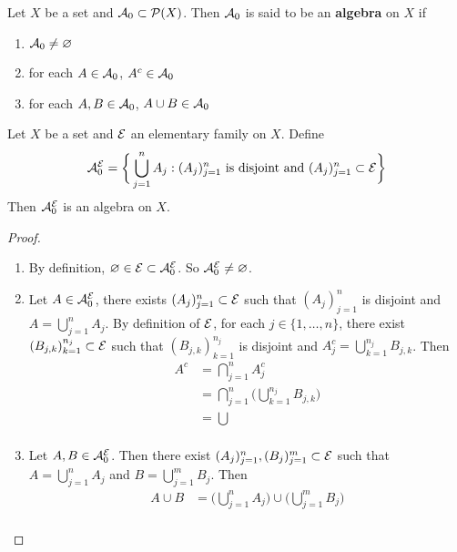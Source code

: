 \documentclass{book}
\begin{document}
	\begin{defn}  
		Let $X$ be a set and $\mathcal{A}_0 \subset \mathcal{P}(X)$. Then $\mathcal{A}_0$ is said to be an \textbf{algebra} on $X$ if 
		\begin{enumerate}
			\item $\mathcal{A}_0 \neq \varnothing$
			\item for each $A \in \mathcal{A}_0$, $A^c \in \mathcal{A}_0$
			\item for each $A,B \in \mathcal{A}_0$, $A \cup B \in \mathcal{A}_0$
		\end{enumerate}
	\end{defn}
	
	\begin{ex}  
		Let $X$ be a set and $\mathcal{E}$ an elementary family on $X$. Define $$\mathcal{A}^{\mathcal{E}}_0 = \bigg \{ \bigcup_{j=1}^n A_j: (A_j)_{j=1}^n \text{ is disjoint and } (A_j)_{j=1}^n \subset \mathcal{E} \bigg \}$$ Then $\mathcal{A}^{\mathcal{E}}_0$ is an algebra on $X$.
	\end{ex}	
	
	\begin{proof}\
		\begin{enumerate}
			\item By definition, $\varnothing \in \mathcal{E} \subset \mathcal{A}^{\mathcal{E}}_0$. So $\mathcal{A}^{\mathcal{E}}_0 \neq \varnothing$. 
			\item Let $A \in \mathcal{A}^{\mathcal{E}}_0$, there exists $(A_j)_{j=1}^n \subset \mathcal{E}$ such that $(A_j)_{j=1}^n$ is disjoint and $A = \bigcup\limits_{j =1}^n A_j$. By definition of $\mathcal{E}$, for each $j \in \{1, \ldots, n\}$, there exist $(B_{j,k})_{k=1}^{n_j} \subset \mathcal{E}$ such that $(B_{j,k})_{k=1}^{n_j}$ is disjoint and $A_j^c = \bigcup\limits_{k=1}^{n_j}B_{j,k}$. Then 
			\begin{align*}
				A^c 
				&= \bigcap_{j=1}^n A_j^c \\
				&= \bigcap_{j=1}^n \bigg( \bigcup\limits_{k=1}^{n_j}B_{j,k} \bigg)\\
				&= \bigcup\\
			\end{align*}	 
			\item Let $A, B \in \mathcal{A}^{\mathcal{E}}_0$. Then there exist $(A_j)_{j=1}^n, (B_j)_{j=1}^m \subset \mathcal{E}$ such that $A = \bigcup\limits_{j=1}^n A_j$ and  $B = \bigcup\limits_{j=1}^m B_j$. Then 
			\begin{align*}
				A \cup B 
				&=  \bigg( \bigcup\limits_{j=1}^n A_j \bigg) \cup \bigg( \bigcup\limits_{j=1}^m B_j \bigg) \\
			\end{align*}
		\end{enumerate}
	\end{proof}
\end{document}
